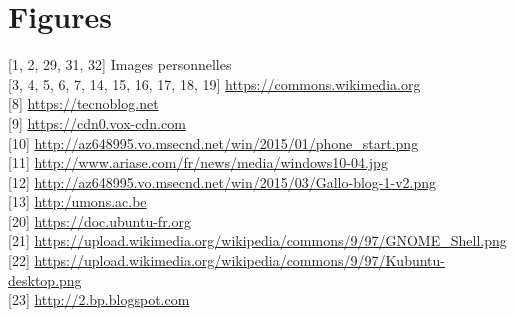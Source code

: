 \section*{Figures}

[1, 2, 29, 31, 32] Images personnelles \\

[3, 4, 5, 6, 7, 14, 15, 16, 17, 18, 19] \href{https://commons.wikimedia.org}{https://commons.wikimedia.org} \\

[8] \href{https://tecnoblog.net/wp-content/uploads/2015/10/windows-1-de-volta-futuro.png}
{https://tecnoblog.net} \\

[9] \href{https://cdn0.vox-cdn.com/thumbor/xw68yMxmzret66x1Eb2h4YpnvRw=/cdn0.vox-cdn.com/uploads/chorus_asset/file/3913062/Screenshot__40_.0.png}
{https://cdn0.vox-cdn.com} \\

[10] \href{http://az648995.vo.msecnd.net/win/2015/01/phone_start.png}
{http://az648995.vo.msecnd.net/win/2015/01/phone\_start.png} \\

[11] \href{http://www.ariase.com/fr/news/media/windows10-04.jpg}
{http://www.ariase.com/fr/news/media/windows10-04.jpg} \\

[12] \href{http://az648995.vo.msecnd.net/win/2015/03/Gallo-blog-1-v2.png}
{http://az648995.vo.msecnd.net/win/2015/03/Gallo-blog-1-v2.png} \\

[13] \href{http:/umons.ac.be}{http:/umons.ac.be} \\

[20] \href{https://doc.ubuntu-fr.org/lib/exe/fetch.php?tok=c9ce59\&media=http\%3A\%2F\%2Fpix.toile-libre.org\%2Fupload\%2Foriginal\%2F1337006028.png}
{https://doc.ubuntu-fr.org} \\

[21] \href{https://upload.wikimedia.org/wikipedia/commons/9/97/GNOME_Shell.png}
{https://upload.wikimedia.org/wikipedia/commons/9/97/GNOME\_Shell.png} \\

[22] \href{https://upload.wikimedia.org/wikipedia/commons/9/97/Kubuntu-12.10-desktop.png}
{https://upload.wikimedia.org/wikipedia/commons/9/97/Kubuntu-desktop.png} \\

[23] \href{http://2.bp.blogspot.com/-F26Pbg1pDuc/UH-l-hoBvDI/AAAAAAAAK-c/NuK3Hhp0B4c/s1600/xubuntu12.10.png}
{http://2.bp.blogspot.com} \\

